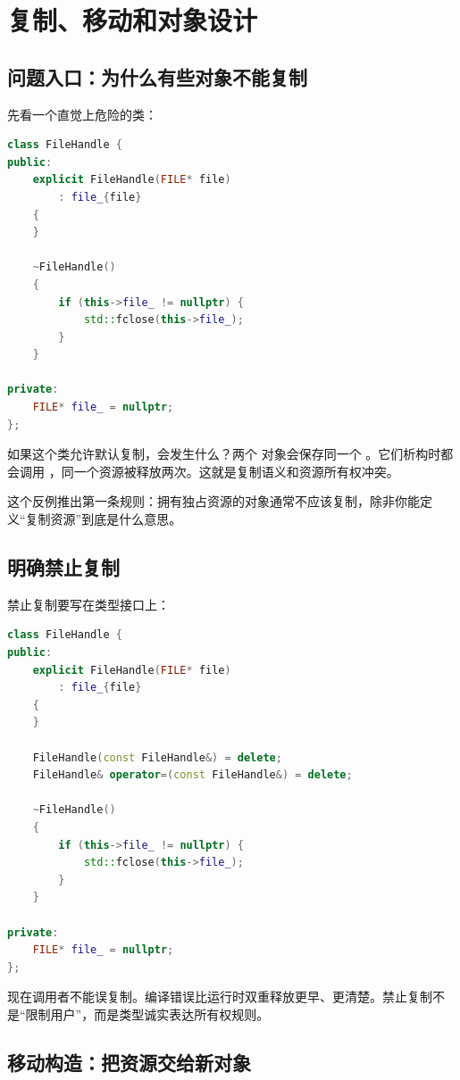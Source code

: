 \chapter{复制、移动和对象设计}

\section{问题入口：为什么有些对象不能复制}

先看一个直觉上危险的类：

\begin{lstlisting}[language=C++,caption={手写资源类的复制风险}]
class FileHandle {
public:
    explicit FileHandle(FILE* file)
        : file_{file}
    {
    }

    ~FileHandle()
    {
        if (this->file_ != nullptr) {
            std::fclose(this->file_);
        }
    }

private:
    FILE* file_ = nullptr;
};
\end{lstlisting}

如果这个类允许默认复制，会发生什么？两个  对象会保存同一个 。它们析构时都会调用 ，同一个资源被释放两次。这就是复制语义和资源所有权冲突。

这个反例推出第一条规则：拥有独占资源的对象通常不应该复制，除非你能定义“复制资源”到底是什么意思。

\section{明确禁止复制}

禁止复制要写在类型接口上：

\begin{lstlisting}[language=C++,caption={禁止复制独占资源对象}]
class FileHandle {
public:
    explicit FileHandle(FILE* file)
        : file_{file}
    {
    }

    FileHandle(const FileHandle&) = delete;
    FileHandle& operator=(const FileHandle&) = delete;

    ~FileHandle()
    {
        if (this->file_ != nullptr) {
            std::fclose(this->file_);
        }
    }

private:
    FILE* file_ = nullptr;
};
\end{lstlisting}

现在调用者不能误复制。编译错误比运行时双重释放更早、更清楚。禁止复制不是“限制用户”，而是类型诚实表达所有权规则。

\section{移动构造：把资源交给新对象}

